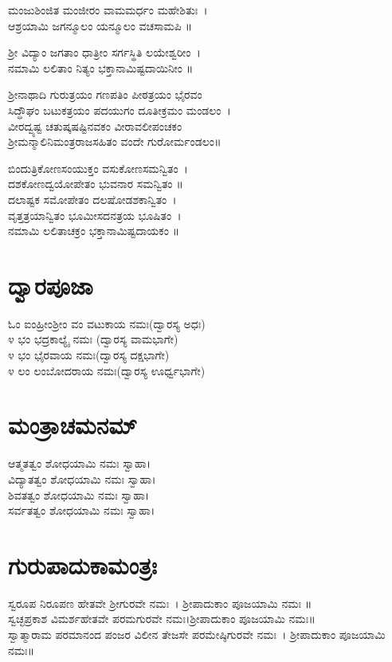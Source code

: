 ಮಂಜುಶಿಂಜಿತ ಮಂಜೀರಂ ವಾಮಮರ್ಧಂ ಮಹೇಶಿತುಃ~।\\
ಆಶ್ರಯಾಮಿ ಜಗನ್ಮೂಲಂ ಯನ್ಮೂಲಂ ವಚಸಾಮಪಿ ॥

ಶ್ರೀ ವಿದ್ಯಾಂ ಜಗತಾಂ ಧಾತ್ರೀಂ ಸರ್ಗಸ್ಥಿತಿ ಲಯೇಶ್ವರೀಂ~।\\
ನಮಾಮಿ ಲಲಿತಾಂ ನಿತ್ಯಂ ಭಕ್ತಾನಾಮಿಷ್ಟದಾಯಿನೀಂ ॥

ಶ್ರೀನಾಥಾದಿ ಗುರುತ್ರಯಂ ಗಣಪತಿಂ ಪೀಠತ್ರಯಂ ಭೈರವಂ\\
ಸಿದ್ಧೌಘಂ ಬಟುಕತ್ರಯಂ ಪದಯುಗಂ ದೂತೀಕ್ರಮಂ ಮಂಡಲಂ~।\\
ವೀರದ್ವ್ಯಷ್ಟ ಚತುಷ್ಕಷಷ್ಟಿನವಕಂ ವೀರಾವಲೀಪಂಚಕಂ\\
ಶ್ರೀಮನ್ಮಾಲಿನಿಮಂತ್ರರಾಜಸಹಿತಂ ವಂದೇ ಗುರೋರ್ಮಂಡಲಂ॥

ಬಿಂದುತ್ರಿಕೋಣಸಂಯುಕ್ತಂ ವಸುಕೋಣಸಮನ್ವಿತಂ~।\\
ದಶಕೋಣದ್ವಯೋಪೇತಂ ಭುವನಾರ ಸಮನ್ವಿತಂ ॥\\
ದಲಾಷ್ಟಕ ಸಮೋಪೇತಂ ದಲಷೋಡಶಕಾನ್ವಿತಂ~।\\
ವೃತ್ತತ್ರಯಾನ್ವಿತಂ ಭೂಮೀಸದನತ್ರಯ ಭೂಷಿತಂ~।\\
ನಮಾಮಿ ಲಲಿತಾಚಕ್ರಂ ಭಕ್ತಾನಾಮಿಷ್ಟದಾಯಕಂ ॥
\section{ದ್ವಾರಪೂಜಾ}
ಓಂ ಐಂಹ್ರೀಂಶ್ರೀಂ ವಂ ವಟುಕಾಯ ನಮಃ(ದ್ವಾರಸ್ಯ ಅಧಃ)\\
೪ ಭಂ ಭದ್ರಕಾಲ್ಯೈ ನಮಃ (ದ್ವಾರಸ್ಯ ವಾಮಭಾಗೇ)\\
೪ ಭಂ ಭೈರವಾಯ ನಮಃ(ದ್ವಾರಸ್ಯ ದಕ್ಷಭಾಗೇ)\\
೪ ಲಂ ಲಂಬೋದರಾಯ ನಮಃ(ದ್ವಾರಸ್ಯ ಊರ್ಧ್ವಭಾಗೇ)
\section{ಮಂತ್ರಾಚಮನಮ್}
 ಆತ್ಮತತ್ವಂ ಶೋಧಯಾಮಿ ನಮಃ ಸ್ವಾಹಾ।\\
 ವಿದ್ಯಾತತ್ವಂ ಶೋಧಯಾಮಿ ನಮಃ ಸ್ವಾಹಾ।\\
 ಶಿವತತ್ವಂ ಶೋಧಯಾಮಿ ನಮಃ ಸ್ವಾಹಾ।\\
 ಸರ್ವತತ್ವಂ ಶೋಧಯಾಮಿ ನಮಃ ಸ್ವಾಹಾ।
\section{ಗುರುಪಾದುಕಾಮಂತ್ರಃ}
 ಸ್ವರೂಪ ನಿರೂಪಣ ಹೇತವೇ ಶ್ರೀಗುರವೇ ನಮಃ~। ಶ್ರೀಪಾದುಕಾಂ ಪೂಜಯಾಮಿ ನಮಃ ॥\\
 ಸ್ವಚ್ಛಪ್ರಕಾಶ ವಿಮರ್ಶಹೇತವೇ ಪರಮಗುರವೇ ನಮಃ।ಶ್ರೀಪಾದುಕಾಂ ಪೂಜಯಾಮಿ ನಮಃ॥\\
 ಸ್ವಾತ್ಮಾರಾಮ ಪರಮಾನಂದ ಪಂಜರ ವಿಲೀನ ತೇಜಸೇ ಪರಮೇಷ್ಠಿಗುರವೇ ನಮಃ~। ಶ್ರೀಪಾದುಕಾಂ ಪೂಜಯಾಮಿ ನಮಃ॥

